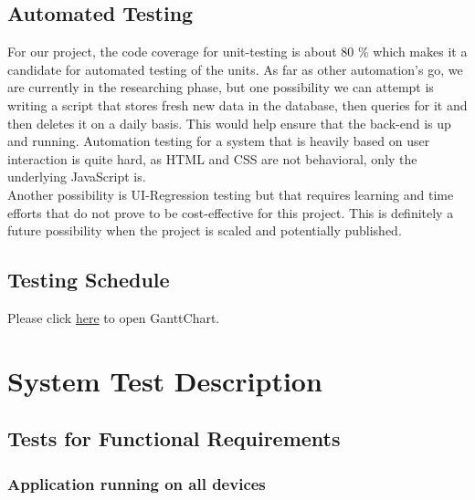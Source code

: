 \documentclass[12pt, titlepage]{article}
\begin{document}
\subsection{Automated Testing}
For our project, the code coverage for unit-testing is about 80 \% which makes it a candidate for automated testing of the units. As far as other automation's go, we are currently in the researching phase, but one possibility we can attempt is writing a script that stores fresh new data in the database, then queries for it and then deletes it on a daily basis. This would help ensure that the back-end is up and running. Automation testing for a system that is heavily based on user interaction is quite hard, as HTML and CSS are not behavioral, only the underlying JavaScript is.\\

Another possibility is UI-Regression testing but that requires learning and time efforts that do not prove to be cost-effective for this project. This is definitely a future possibility when the project is scaled and potentially published. 

\subsection{Testing Schedule}
		
Please click \href{run:../../ProjectSchedule/GanttChart.gan}{here} to open GanttChart.

\section{System Test Description}
	
\subsection{Tests for Functional Requirements}

\subsubsection{Application running on all devices}
		
\end{document}
